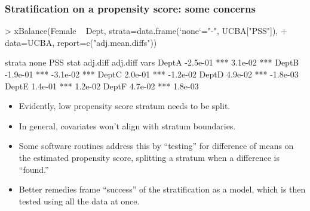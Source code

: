 \begin{frame}
  \frametitle{Stratification on a propensity score: some concerns}
\begin{Schunk}
\begin{Sinput}
> xBalance(Female ~ Dept, strata=data.frame(`none`="-", UCBA["PSS"]), 
+ data=UCBA, report=c("adj.mean.diffs"))
\end{Sinput}
\begin{Soutput}
      strata     none               PSS         
      stat   adj.diff          adj.diff         
vars                                            
DeptA        -2.5e-01 ***      3.1e-02  ***     
DeptB        -1.9e-01 ***      -3.1e-02 ***     
DeptC        2.0e-01  ***      -1.2e-02         
DeptD        4.9e-02  ***      -1.8e-03         
DeptE        1.4e-01  ***      1.2e-02          
DeptF        4.7e-02  ***      1.8e-03          
\end{Soutput}
\end{Schunk}
  \begin{itemize}[<+-| alert@+>]
  \item 
  Evidently, low propensity score stratum needs to be split.
\item In general, covariates won't align with stratum boundaries.
  \item Some software routines address this by ``testing'' for difference of means on the estimated propensity score, splitting a stratum when a difference is ``found.''
  \item Better remedies frame ``success'' of the stratification as a
    model, which is then tested using all the data at once.
\end{itemize}
\end{frame}


\nocite{hansen:klopfer:2006,rosenbaum:2002}


